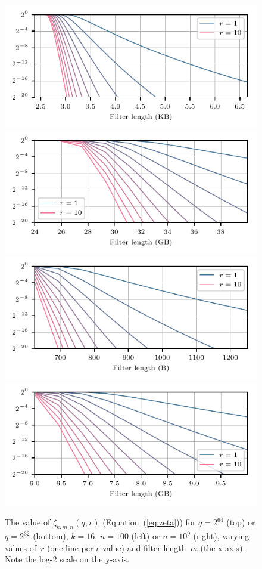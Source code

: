 \begin{figure}
  \hspace*{-10pt}
  \includegraphics[scale=0.9]{fig/bf-bound}
  \includegraphics[scale=0.9]{fig/bf-bound-big}
  \includegraphics[scale=0.9]{fig/bf-bound-online}
  \includegraphics[scale=0.9]{fig/bf-bound-big-online}
  \caption{
    The value of $\zeta_{k,m,n}(q,r)$ (Equation~(\ref{eq:zeta})) for $q=2^{64}$ (top) or $q = 2^{32}$ (bottom),
    $k=16$, $n=100$ (left) or $n=10^9$ (right), varying values of~$r$ (one line per $r$-value) and filter
    length~$m$ (the x-axis).  Note the log-2 scale on the y-axis.
  }
  \label{fig:bf-bound}
\end{figure}

